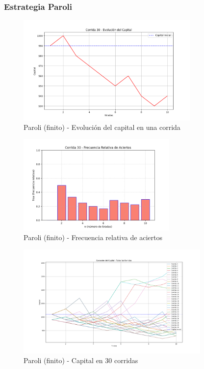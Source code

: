 \documentclass{article}
\begin{document}
\subsubsection*{Estrategia Paroli}


\begin{figure}[H]
    \centering
    \includegraphics[width=0.8\textwidth]{./images/capital_corrida_30_p_f.png}
    \caption{Paroli (finito) - Evolución del capital en una corrida}
\end{figure}

\begin{figure}[H]
    \centering
    \includegraphics[width=0.7\textwidth]{./images/frsa_corrida_30_p_f.png}
    \caption{Paroli (finito) - Frecuencia relativa de aciertos}
\end{figure}

\begin{figure}[H]
    \centering
    \includegraphics[width=0.85\textwidth]{./images/capital_todas_corridas_p_f.png}
    \caption{Paroli (finito) - Capital en 30 corridas}
\end{figure}
\end{document}

